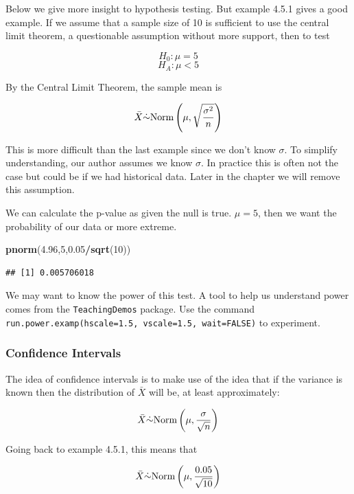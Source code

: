 \documentclass[]{book}
\newenvironment{Shaded}{\begin{snugshade}}{\end{snugshade}}
\newcommand{\KeywordTok}[1]{\textcolor[rgb]{0.13,0.29,0.53}{\textbf{#1}}}
\newcommand{\DecValTok}[1]{\textcolor[rgb]{0.00,0.00,0.81}{#1}}
\newcommand{\FloatTok}[1]{\textcolor[rgb]{0.00,0.00,0.81}{#1}}
\newcommand{\OperatorTok}[1]{\textcolor[rgb]{0.81,0.36,0.00}{\textbf{#1}}}
\newcommand{\NormalTok}[1]{#1}
\theoremstyle{definition}
\theoremstyle{definition}
\theoremstyle{definition}
\theoremstyle{remark}
\begin{document}
Below we give more insight to hypothesis testing. But example 4.5.1
gives a good example. If we assume that a sample size of 10 is
sufficient to use the central limit theorem, a questionable assumption
without more support, then to test

\[H_{0}: \mu = 5\] \[H_{A}: \mu < 5\]

By the Central Limit Theorem, the sample mean is

\[\bar{X}\dot{\sim} \mbox{Norm}\left(\mu,{\sqrt{\sigma^{2}  \over n}}\right)\]

This is more difficult than the last example since we don't know
\(\sigma\). To simplify understanding, our author assumes we know
\(\sigma\). In practice this is often not the case but could be if we
had historical data. Later in the chapter we will remove this
assumption.

We can calculate the p-value as given the null is true. \(\mu = 5\),
then we want the probability of our data or more extreme.

\begin{Shaded}
\begin{Highlighting}[]
\KeywordTok{pnorm}\NormalTok{(}\FloatTok{4.96}\NormalTok{,}\DecValTok{5}\NormalTok{,}\FloatTok{0.05}\OperatorTok{/}\KeywordTok{sqrt}\NormalTok{(}\DecValTok{10}\NormalTok{))}
\end{Highlighting}
\end{Shaded}

\begin{verbatim}
## [1] 0.005706018
\end{verbatim}

We may want to know the power of this test. A tool to help us understand
power comes from the \texttt{TeachingDemos} package. Use the command
\texttt{run.power.examp(hscale=1.5,\ vscale=1.5,\ wait=FALSE)} to
experiment.

\subsubsection{Confidence Intervals}\label{confidence-intervals}

The idea of confidence intervals is to make use of the idea that if the
variance is known then the distribution of \(\bar{X}\) will be, at least
approximately:

\[\bar{X}\dot{\sim} \mbox{Norm}\left(\mu,{\sigma \over \sqrt{n}}\right)\]

Going back to example 4.5.1, this means that

\[\bar{X}\dot{\sim} \mbox{Norm}\left(\mu,{0.05 \over \sqrt{10}}\right)\]
\end{document}
